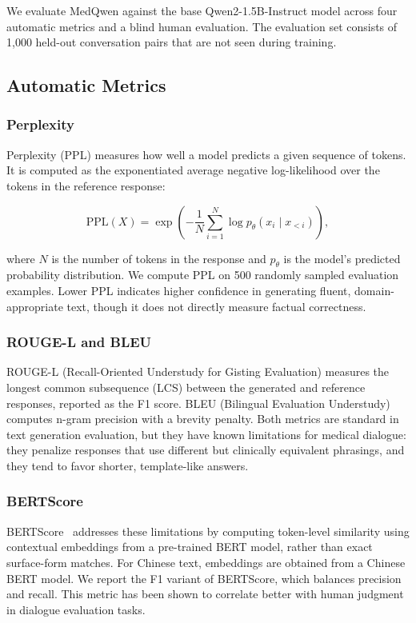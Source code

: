 \documentclass[11pt,a4paper]{article}
\begin{document}
We evaluate MedQwen against the base Qwen2-1.5B-Instruct model across four automatic metrics and a blind human evaluation. The evaluation set consists of 1,000 held-out conversation pairs that are not seen during training.

\subsection{Automatic Metrics}

\subsubsection{Perplexity}

Perplexity (PPL) measures how well a model predicts a given sequence of tokens. It is computed as the exponentiated average negative log-likelihood over the tokens in the reference response:

\begin{equation}
\text{PPL}(X) = \exp\left(-\frac{1}{N}\sum_{i=1}^{N} \log p_\theta(x_i \mid x_{<i})\right),
\end{equation}

where $N$ is the number of tokens in the response and $p_\theta$ is the model's predicted probability distribution. We compute PPL on 500 randomly sampled evaluation examples. Lower PPL indicates higher confidence in generating fluent, domain-appropriate text, though it does not directly measure factual correctness.

\subsubsection{ROUGE-L and BLEU}

ROUGE-L (Recall-Oriented Understudy for Gisting Evaluation) measures the longest common subsequence (LCS) between the generated and reference responses, reported as the F1 score. BLEU (Bilingual Evaluation Understudy) computes n-gram precision with a brevity penalty. Both metrics are standard in text generation evaluation, but they have known limitations for medical dialogue: they penalize responses that use different but clinically equivalent phrasings, and they tend to favor shorter, template-like answers.

\subsubsection{BERTScore}

BERTScore~\cite{zhang2019bertscore} addresses these limitations by computing token-level similarity using contextual embeddings from a pre-trained BERT model, rather than exact surface-form matches. For Chinese text, embeddings are obtained from a Chinese BERT model. We report the F1 variant of BERTScore, which balances precision and recall. This metric has been shown to correlate better with human judgment in dialogue evaluation tasks.
\end{document}
